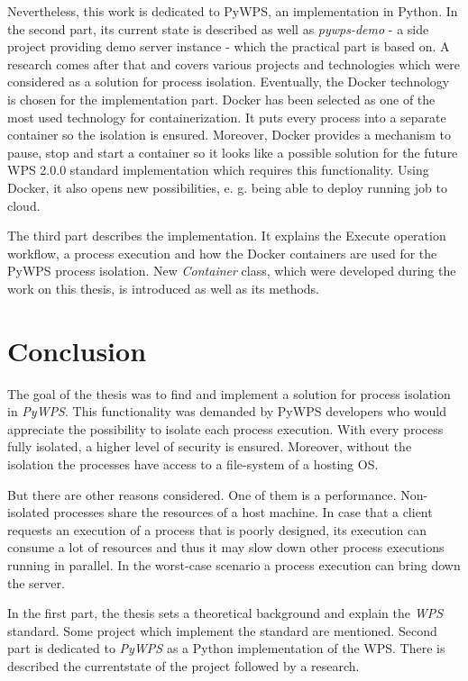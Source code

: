 \documentclass[12pt,a4paper]{article}
\newcommand{\necislovana}[1]{%
\phantomsection
\addcontentsline{toc}{section}{#1}



\section*{#1}
\markboth{\uppercase{#1}}{}
}
\begin{document}
Nevertheless, this work is dedicated to PyWPS, an implementation in Python. In the second part, its current state
is described as well as \textit{pywps-demo} - a side project providing demo server instance - which the practical
part is based on. A research comes after that and covers various projects and technologies which were considered
as a solution for process isolation. Eventually, the Docker technology is chosen for the implementation part.
Docker has been selected as one of the most used technology for containerization. It puts every process into a separate
container so the isolation is ensured. Moreover, Docker provides a mechanism to pause, stop and start a container so it
looks like a possible solution for the future WPS 2.0.0 standard implementation which requires this functionality. Using
Docker, it also opens new possibilities, e. g. being able to deploy running job to cloud.

The third part describes the implementation. It explains the Execute operation workflow, a process execution and how the Docker containers are used for the PyWPS process isolation. New \textit{Container} class, which were developed during
the work on this thesis, is introduced as well as its methods.







\newpage
\necislovana{Conclusion}
The goal of the thesis was to find and implement a solution for process isolation in \textit{PyWPS}. This functionality was 
demanded by PyWPS developers who would appreciate the possibility to isolate each process execution. With every process 
fully isolated, a higher level of security is ensured. Moreover, without the isolation the processes have access to a 
file-system of a hosting OS.

But there are other reasons considered. One of them is a performance. Non-isolated processes share the resources
of a host machine. In case that a client requests an execution of a process that is poorly designed, its execution
can consume a lot of resources and thus it may slow down other process executions running in parallel. In the 
worst-case scenario a process execution can bring down the server.

In the first part, the thesis sets a theoretical background and explain the \textit{WPS} standard. Some project which implement 
the standard are mentioned. Second part is dedicated to \textit{PyWPS} as a Python implementation of the WPS. There is described 
the currentstate of the project followed by a research.
\end{document}
